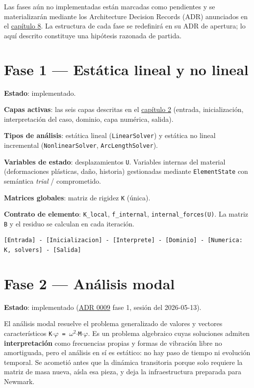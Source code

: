 \documentclass[11pt,oneside]{report}
\begin{document}
Las fases aún no implementadas están marcadas como pendientes y se materializarán mediante los Architecture Decision Records (ADR) anunciados en el \hyperref[cap:8]{capítulo 8}. La estructura de cada fase se redefinirá en su ADR de apertura; lo aquí descrito constituye una hipótesis razonada de partida.

\section{Fase 1 --- Estática lineal y no lineal}

\textbf{Estado}: implementado.

\textbf{Capas activas}: las seis capas descritas en el \hyperref[cap:2]{capítulo 2} (entrada, inicialización, interpretación del caso, dominio, capa numérica, salida).

\textbf{Tipos de análisis}: estática lineal (\texttt{LinearSolver}) y estática no lineal incremental (\texttt{NonlinearSolver}, \texttt{ArcLengthSolver}).

\textbf{Variables de estado}: desplazamientos \texttt{U}. Variables internas del material (deformaciones plásticas, daño, historia) gestionadas mediante \texttt{ElementState} con semántica \textit{trial} / comprometido.

\textbf{Matrices globales}: matriz de rigidez \texttt{K} (única).

\textbf{Contrato de elemento}: \texttt{K\_local}, \texttt{f\_internal}, \texttt{internal\_\allowbreak{}forces(U)}. La matriz \texttt{B} y el residuo se calculan en cada iteración.

\begin{lstlisting}
[Entrada] - [Inicializacion] - [Interprete] - [Dominio] - [Numerica: K, solvers] - [Salida]

\end{lstlisting}

\section{Fase 2 --- Análisis modal}

\textbf{Estado}: implementado (\hyperref[adr:0009]{ADR 0009} fase 1, sesión del 2026-05-13).

El análisis modal resuelve el problema generalizado de valores y vectores característicos \texttt{K\ensuremath{\cdot}\ensuremath{\varphi} = \ensuremath{\omega}\ensuremath{^{2}}\ensuremath{\cdot}M\ensuremath{\cdot}\ensuremath{\varphi}}. Es un problema algebraico cuyas soluciones admiten \textbf{interpretación} como frecuencias propias y formas de vibración libre no amortiguada, pero el análisis en sí es estático: no hay paso de tiempo ni evolución temporal. Se acometió antes que la dinámica transitoria porque solo requiere la matriz de masa nueva, aísla esa pieza, y deja la infraestructura preparada para Newmark.
\end{document}
